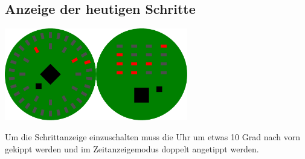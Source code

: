 \subsection{Anzeige der heutigen Schritte}
\begin{center}
\includegraphics[width=0.6\textwidth]{../Graphics/ShowSteps32768}
\end{center}
Um die Schrittanzeige einzuschalten muss die Uhr um etwas 10 Grad nach vorn gekippt werden und im Zeitanzeigemodus doppelt angetippt werden.

